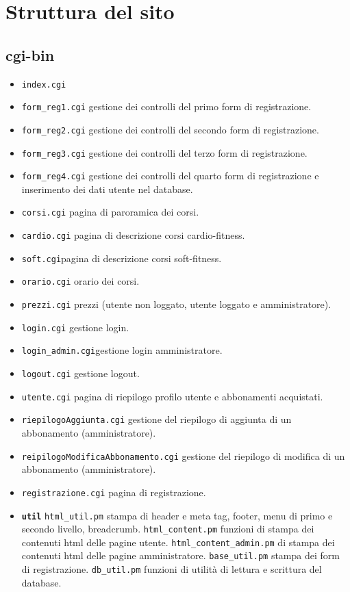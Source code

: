 \documentclass[12pt,a4paper]{article}
\begin{document}
\section{Struttura del sito}
\subsection{cgi-bin}
\begin{itemize}
	\item \texttt{index.cgi}
	\item \texttt{form\_reg1.cgi} gestione dei controlli del primo form di registrazione. 
	\item \texttt{form\_reg2.cgi} gestione dei controlli del secondo form di registrazione.
	\item \texttt{form\_reg3.cgi} gestione dei controlli del terzo form di registrazione.
	\item \texttt{form\_reg4.cgi} gestione dei controlli del quarto form di registrazione e inserimento dei dati utente nel database.
	\item \texttt{corsi.cgi} pagina di paroramica dei corsi.
	\item \texttt{cardio.cgi} pagina di descrizione corsi cardio-fitness.
	\item \texttt{soft.cgi}pagina di descrizione corsi soft-fitness.
	\item \texttt{orario.cgi} orario dei corsi. 
	\item \texttt{prezzi.cgi} prezzi (utente non loggato, utente loggato e amministratore).
	\item \texttt{login.cgi} gestione login. 
	\item \texttt{login\_admin.cgi}gestione login amministratore.
	\item \texttt{logout.cgi} gestione logout.
	\item \texttt{utente.cgi}	pagina di riepilogo profilo utente e abbonamenti acquistati. 
	\item \texttt{riepilogoAggiunta.cgi} gestione del riepilogo di aggiunta di un abbonamento (amministratore).
	\item \texttt{reipilogoModificaAbbonamento.cgi} gestione del riepilogo di modifica di un abbonamento (amministratore).
	\item \texttt{registrazione.cgi}  pagina di registrazione.
	\item\textbf{ \texttt{util}}
	\subitem \texttt{html\_util.pm} stampa di header e meta tag, footer, menu di primo e secondo livello, breadcrumb. 
	\subitem \texttt{html\_content.pm} funzioni di stampa dei contenuti html delle pagine utente.
	\subitem \texttt{html\_content\_admin.pm}  di stampa dei contenuti html delle pagine amministratore. 
	\subitem \texttt{base\_util.pm} stampa dei form di registrazione. 
	\subitem \texttt{db\_util.pm} funzioni di utilità di lettura e scrittura del database. 
\end{itemize}
\end{document}
